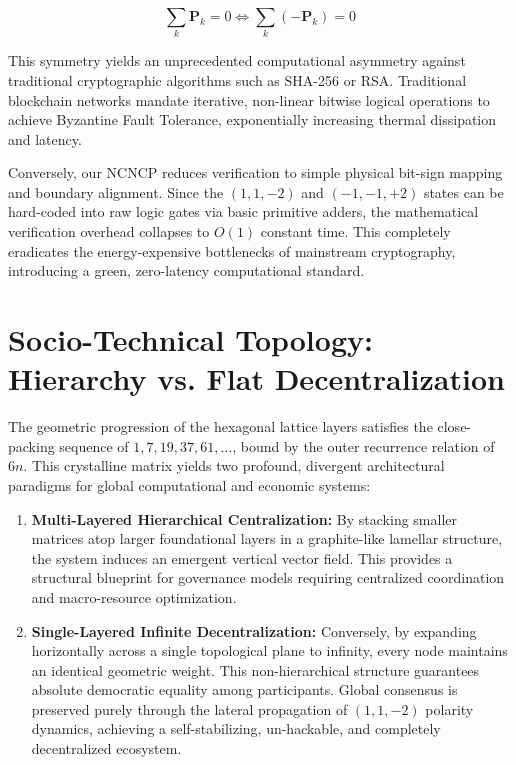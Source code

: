 \documentclass[11pt,twocolumn]{article}
\begin{document}
    \begin{equation}
        \sum_{k} \mathbf{P}_k = 0 \iff \sum_{k} (-\mathbf{P}_k) = 0
    \end{equation}

    This symmetry yields an unprecedented computational asymmetry against traditional cryptographic algorithms such as SHA-256 or RSA. Traditional blockchain networks mandate iterative, non-linear bitwise logical operations to achieve Byzantine Fault Tolerance, exponentially increasing thermal dissipation and latency.

    Conversely, our NCNCP reduces verification to simple physical bit-sign mapping and boundary alignment. Since the $(1,1,-2)$ and $(-1,-1,+2)$ states can be hard-coded into raw logic gates via basic primitive adders, the mathematical verification overhead collapses to $O(1)$ constant time. This completely eradicates the energy-expensive bottlenecks of mainstream cryptography, introducing a green, zero-latency computational standard.

    \section{Socio-Technical Topology: Hierarchy vs. Flat Decentralization}
    The geometric progression of the hexagonal lattice layers satisfies the close-packing sequence of $1, 7, 19, 37, 61, \dots$, bound by the outer recurrence relation of $6n$. This crystalline matrix yields two profound, divergent architectural paradigms for global computational and economic systems:

    \begin{enumerate}
        \item \textbf{Multi-Layered Hierarchical Centralization:} By stacking smaller matrices atop larger foundational layers in a graphite-like lamellar structure, the system induces an emergent vertical vector field. This provides a structural blueprint for governance models requiring centralized coordination and macro-resource optimization.
        \item \textbf{Single-Layered Infinite Decentralization:} Conversely, by expanding horizontally across a single topological plane to infinity, every node maintains an identical geometric weight. This non-hierarchical structure guarantees absolute democratic equality among participants. Global consensus is preserved purely through the lateral propagation of $(1,1,-2)$ polarity dynamics, achieving a self-stabilizing, un-hackable, and completely decentralized ecosystem.
    \end{enumerate}
\end{document}
